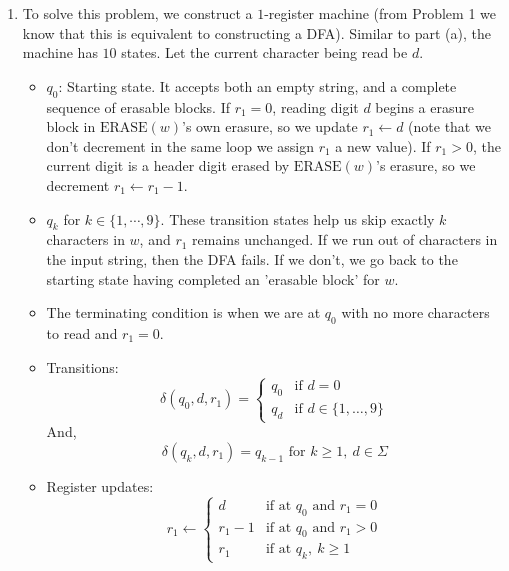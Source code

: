 \documentclass[12pt]{article}
\begin{document}
\begin{solution}
\begin{enumerate}
        \newpage

        \item [(b)] To solve this problem, we construct a $1$-register machine (from Problem 1 we know that this is equivalent to constructing a DFA). Similar to part (a), the machine has $10$ states. Let the current character being read be $d$. 
        \begin{itemize}
            \item $q_0$: Starting state. It accepts both an empty string, and a complete sequence of erasable blocks. If $r_1 = 0$, reading digit $d$ begins a erasure block in $\text{ERASE}(w)$'s own erasure, so we update $r_1 \leftarrow d$ (note that we don't decrement in the same loop we assign $r_1$ a new value). 
            If $r_1 > 0$, the current digit is a header digit erased by $\text{ERASE}(w)$'s erasure, so we decrement $r_1 \leftarrow r_1 - 1$.
            
            \item $q_k$ for $k\in \{1, \cdots, 9\}$. These transition states help us skip exactly $k$ characters in $w$, and $r_1$ remains unchanged. If we run out of characters in the input string, then the DFA fails. If we don't, we go back to the starting state having completed an 'erasable block' for $w$. 
            \item The terminating condition is when we are at $q_0$ with no more characters to read and $r_1 = 0$.  
            \item Transitions: 
                \[
                \delta(q_0, d, r_1) = \begin{cases} q_0 & \text{if } d = 0 \\ q_d & \text{if } 
                d \in \{1, \ldots, 9\} \end{cases}\]
                And, 
                \[\delta(q_k, d, r_1) = q_{k-1} \text{ for } k \geq 1,\ d \in \Sigma
                \]

            \item Register updates:
                \[
                r_1 \leftarrow \begin{cases} d & \text{if at } q_0 \text{ and } r_1 = 0 \\ 
                r_1 - 1 & \text{if at } q_0 \text{ and } r_1 > 0 \\ 
                r_1 & \text{if at } q_k,\ k \geq 1 \end{cases}
                \]
        \end{itemize}
        

\end{enumerate}
\end{solution}
\end{document}
